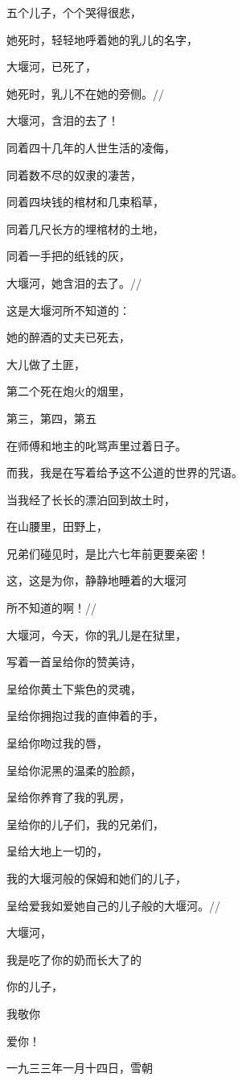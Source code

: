 \documentclass[letterpaper,12pt,english]{sphinxmanual}
\begin{document}
五个儿子，个个哭得很悲，

她死时，轻轻地呼着她的乳儿的名字，

大堰河，已死了，

她死时，乳儿不在她的旁侧。//

大堰河，含泪的去了！

同着四十几年的人世生活的凌侮，

同着数不尽的奴隶的凄苦，

同着四块钱的棺材和几束稻草，

同着几尺长方的埋棺材的土地，

同着一手把的纸钱的灰，

大堰河，她含泪的去了。//

这是大堰河所不知道的：

她的醉酒的丈夫已死去，

大儿做了土匪，

第二个死在炮火的烟里，

第三，第四，第五

在师傅和地主的叱骂声里过着日子。

而我，我是在写着给予这不公道的世界的咒语。

当我经了长长的漂泊回到故土时，

在山腰里，田野上，

兄弟们碰见时，是比六七年前更要亲密！

这，这是为你，静静地睡着的大堰河

所不知道的啊！//

大堰河，今天，你的乳儿是在狱里，

写着一首呈给你的赞美诗，

呈给你黄土下紫色的灵魂，

呈给你拥抱过我的直伸着的手，

呈给你吻过我的唇，

呈给你泥黑的温柔的脸颜，

呈给你养育了我的乳房，

呈给你的儿子们，我的兄弟们，

呈给大地上一切的，

我的大堰河般的保姆和她们的儿子，

呈给爱我如爱她自己的儿子般的大堰河。//

大堰河，

我是吃了你的奶而长大了的

你的儿子，

我敬你

爱你！

一九三三年一月十四日，雪朝
\end{document}
